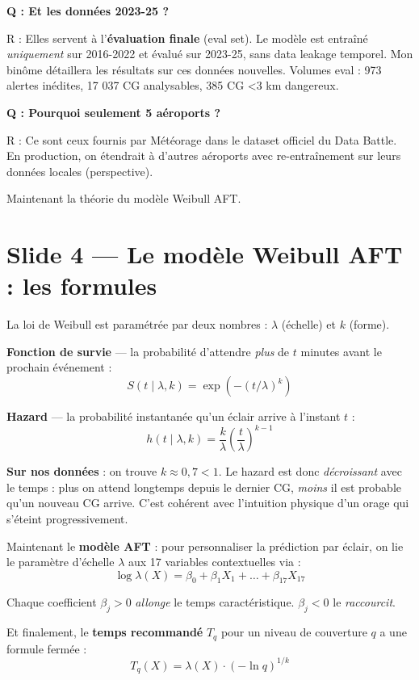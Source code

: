 \documentclass[11pt,a4paper]{article}
\begin{document}
\begin{piege}
\textbf{Q : Et les données 2023-25 ?}

R : Elles servent à l'\textbf{évaluation finale} (eval set). Le modèle est entraîné
\emph{uniquement} sur 2016-2022 et évalué sur 2023-25, sans data leakage temporel.
Mon binôme détaillera les résultats sur ces données nouvelles. Volumes eval : 973 alertes
inédites, 17 037 CG analysables, 385 CG <3 km dangereux.

\textbf{Q : Pourquoi seulement 5 aéroports ?}

R : Ce sont ceux fournis par Météorage dans le dataset officiel du Data Battle. En
production, on étendrait à d'autres aéroports avec re-entraînement sur leurs données
locales (perspective).
\end{piege}

\begin{transit}
\og Maintenant la théorie du modèle Weibull AFT. \fg{}
\end{transit}

\section{Slide 4 — Le modèle Weibull AFT : les formules}

\begin{dire}
\og La loi de Weibull est paramétrée par deux nombres : $\lambda$ (échelle) et $k$ (forme).

\textbf{Fonction de survie} — la probabilité d'attendre \emph{plus} de $t$ minutes avant
le prochain événement :
$$S(t \mid \lambda, k) = \exp\!\left(-(t/\lambda)^k\right)$$

\textbf{Hazard} — la probabilité instantanée qu'un éclair arrive à l'instant $t$ :
$$h(t \mid \lambda, k) = \frac{k}{\lambda}\left(\frac{t}{\lambda}\right)^{k-1}$$

\textbf{Sur nos données} : on trouve $k \approx 0{,}7 < 1$. Le hazard est donc
\emph{décroissant} avec le temps : plus on attend longtemps depuis le dernier CG,
\emph{moins} il est probable qu'un nouveau CG arrive. C'est cohérent avec l'intuition
physique d'un orage qui s'éteint progressivement.

Maintenant le \textbf{modèle AFT} : pour personnaliser la prédiction par éclair, on lie
le paramètre d'échelle $\lambda$ aux 17 variables contextuelles via :
$$\log \lambda(X) = \beta_0 + \beta_1 X_1 + \dots + \beta_{17} X_{17}$$

Chaque coefficient $\beta_j > 0$ \emph{allonge} le temps caractéristique. $\beta_j < 0$
le \emph{raccourcit}.

Et finalement, le \textbf{temps recommandé} $T_q$ pour un niveau de couverture $q$ a une
formule fermée :
$$T_q(X) = \lambda(X) \cdot (-\ln q)^{1/k}$$
\fg{}
\end{dire}
\end{document}
